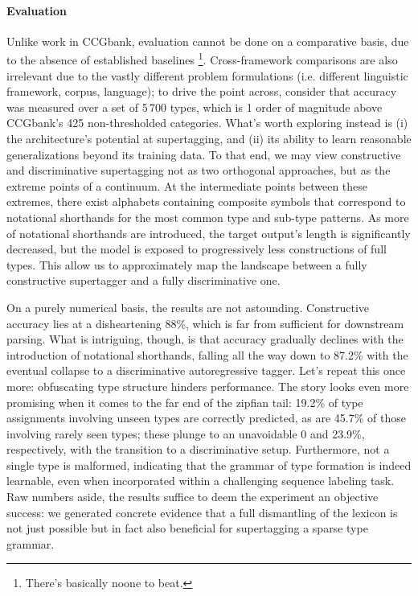 \paragraph{Evaluation}
Unlike work in CCGbank, evaluation cannot be done on a comparative basis, due to the absence of established baselines%
	\footnote{There's basically noone to beat.}.
Cross-framework comparisons are also irrelevant due to the vastly different problem formulations (i.e. different linguistic framework, corpus, language); to drive the point across, consider that accuracy was measured over a set of 5\,700 types, which is 1 order of magnitude above CCGbank's 425 non-thresholded categories.
What's worth exploring instead is (i) the architecture's potential at supertagging, and (ii) its ability to learn reasonable generalizations beyond its training data.
To that end, we may view constructive and discriminative supertagging not as two orthogonal approaches, but as the extreme points of a continuum.
At the intermediate points between these extremes, there exist alphabets containing composite symbols that correspond to notational shorthands for the most common type and sub-type patterns.
As more of notational shorthands are introduced, the target output's length is significantly decreased, but the model is exposed to progressively less constructions of full types.
This allow us to approximately map the landscape between a fully constructive supertagger and a fully discriminative one.

On a purely numerical basis, the results are not astounding. 
Constructive accuracy lies at a disheartening 88\%, which is far from sufficient for downstream parsing.
What is intriguing, though, is that accuracy gradually declines with the introduction of notational shorthands, falling all the way down to 87.2\% with the eventual collapse to a discriminative autoregressive tagger.
Let's repeat this once more: obfuscating type structure hinders performance.
The story looks even more promising when it comes to the far end of the zipfian tail: 19.2\% of type assignments involving unseen types are correctly predicted, as are 45.7\% of those involving rarely seen types; these plunge to an unavoidable 0 and 23.9\%, respectively, with the transition to a discriminative setup.
Furthermore, not a single type is malformed, indicating that the grammar of type formation is indeed learnable, even when incorporated within a challenging sequence labeling task.
Raw numbers aside, the results suffice to deem the experiment an objective success: we generated concrete evidence that a full dismantling of the lexicon is not just possible but in fact also beneficial for supertagging a sparse type grammar.

